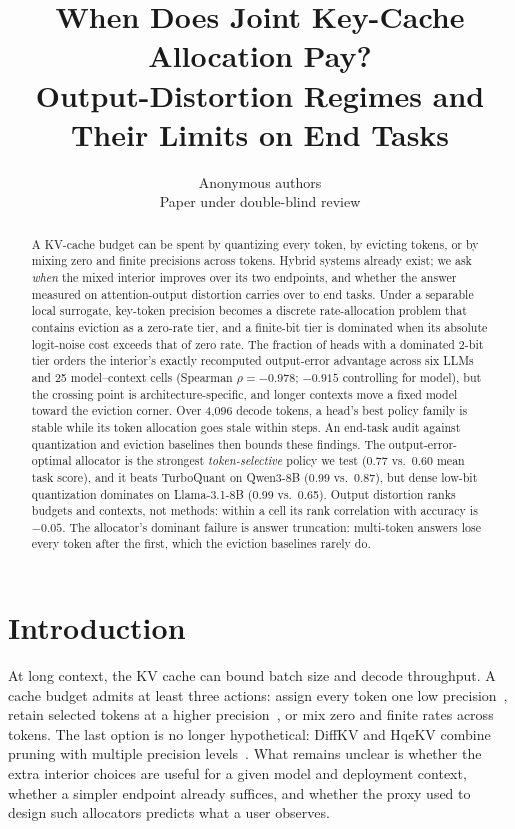 \documentclass{article}
\title{When Does Joint Key-Cache Allocation Pay?\\
Output-Distortion Regimes and Their Limits on End Tasks}
\author{Anonymous authors \\ Paper under double-blind review}
\theoremstyle{definition}
\begin{document}
\maketitle

\begin{abstract}
A KV-cache budget can be spent by quantizing every token, by evicting tokens, or by mixing zero and finite precisions across tokens.  Hybrid systems already exist; we ask \emph{when} the mixed interior improves over its two endpoints, and whether the answer measured on attention-output distortion carries over to end tasks.  Under a separable local surrogate, key-token precision becomes a discrete rate-allocation problem that contains eviction as a zero-rate tier, and a finite-bit tier is dominated when its absolute logit-noise cost exceeds that of zero rate.  The fraction of heads with a dominated 2-bit tier orders the interior's exactly recomputed output-error advantage across six LLMs and 25 model--context cells (Spearman $\rho=-0.978$; $-0.915$ controlling for model), but the crossing point is architecture-specific, and longer contexts move a fixed model toward the eviction corner.  Over 4,096 decode tokens, a head's best policy family is stable while its token allocation goes stale within steps.  An end-task audit against quantization and eviction baselines then bounds these findings.  The output-error-optimal allocator is the strongest \emph{token-selective} policy we test (0.77 vs.\ 0.60 mean task score), and it beats TurboQuant on Qwen3-8B (0.99 vs.\ 0.87), but dense low-bit quantization dominates on Llama-3.1-8B (0.99 vs.\ 0.65).  Output distortion ranks budgets and contexts, not methods: within a cell its rank correlation with accuracy is $-0.05$.  The allocator's dominant failure is answer truncation: multi-token answers lose every token after the first, which the eviction baselines rarely do.
\end{abstract}

\section{Introduction}
\label{sec:intro}

At long context, the KV cache can bound batch size and decode throughput.  A cache budget admits at least three actions: assign every token one low precision~\citep{liu2024kivi,hooper2024kvquant,zandieh2025turboquant}, retain selected tokens at a higher precision~\citep{zhang2023h2o,liu2023scissorhands,li2024snapkv,xiao2024streamingllm}, or mix zero and finite rates across tokens.  The last option is no longer hypothetical: DiffKV and HqeKV combine pruning with multiple precision levels~\citep{zhang2025diffkv,wang-etal-2026-hqekv}.  What remains unclear is whether the extra interior choices are useful for a given model and deployment context, whether a simpler endpoint already suffices, and whether the proxy used to design such allocators predicts what a user observes.
\end{document}
